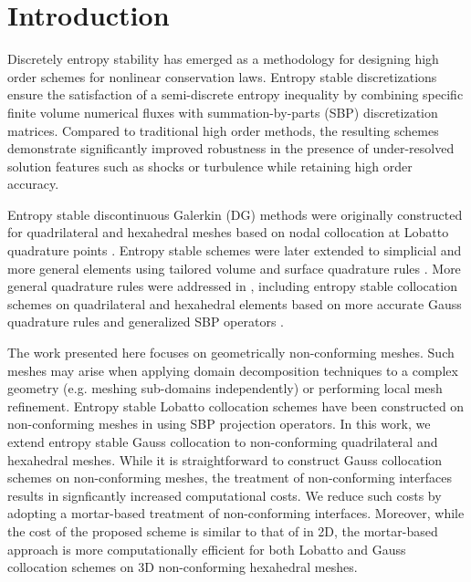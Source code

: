 \documentclass{svjour3}                     %
\renewcommand{\note}[1]{{\color{blue}{#1}}}
\begin{document}
\section{Introduction}


Discretely entropy stability has emerged as a methodology for designing high order schemes for nonlinear conservation laws.  Entropy stable discretizations ensure the satisfaction of a semi-discrete entropy inequality by combining specific finite volume numerical fluxes with summation-by-parts (SBP) discretization matrices.  Compared to traditional high order methods, the resulting schemes demonstrate significantly improved robustness in the presence of under-resolved solution features such as shocks or turbulence while retaining high order accuracy.  


Entropy stable discontinuous Galerkin (DG) methods were originally constructed for quadrilateral and hexahedral meshes based on nodal collocation at Lobatto quadrature points \cite{fisher2013high, carpenter2014entropy, gassner2016split}.  Entropy stable schemes were later extended to simplicial and more general elements using tailored volume and surface quadrature rules \cite{chen2017entropy, crean2018entropy}.   More general quadrature rules were addressed in \cite{chan2017discretely, chan2018discretely, chan2018efficient, chan2019skew}, including entropy stable collocation schemes on quadrilateral and hexahedral elements based on more accurate Gauss quadrature rules and generalized SBP operators \cite{chan2018efficient}.

The work presented here focuses on geometrically non-conforming meshes.  Such meshes may arise when applying domain decomposition techniques to a complex geometry (e.g. meshing sub-domains independently)  \cite{bernardi1993domain} or performing local mesh refinement.  Entropy stable Lobatto collocation schemes have been constructed on non-conforming meshes in \cite{friedrich2017entropy} using SBP projection operators.  In this work, we extend entropy stable Gauss collocation to non-conforming quadrilateral and hexahedral meshes.  While it is straightforward to construct Gauss collocation schemes on non-conforming meshes, the treatment of non-conforming interfaces results in signficantly increased computational costs.  We reduce such costs by adopting a mortar-based treatment of non-conforming interfaces.  Moreover, while the cost of the proposed scheme is similar to that of  \cite{friedrich2017entropy} in 2D, the mortar-based approach is more computationally efficient for both Lobatto and Gauss collocation schemes on 3D non-conforming hexahedral meshes.  
\end{document}
